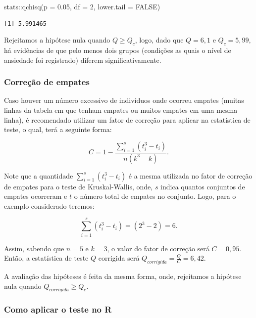 \documentclass[
  letterpaper,
  DIV=11,
  numbers=noendperiod]{scrreprt}
\newenvironment{Shaded}{\begin{snugshade}}{\end{snugshade}}
\newcommand{\AttributeTok}[1]{\textcolor[rgb]{0.40,0.45,0.13}{#1}}
\newcommand{\ConstantTok}[1]{\textcolor[rgb]{0.56,0.35,0.01}{#1}}
\newcommand{\DecValTok}[1]{\textcolor[rgb]{0.68,0.00,0.00}{#1}}
\newcommand{\FloatTok}[1]{\textcolor[rgb]{0.68,0.00,0.00}{#1}}
\newcommand{\FunctionTok}[1]{\textcolor[rgb]{0.28,0.35,0.67}{#1}}
\newcommand{\NormalTok}[1]{\textcolor[rgb]{0.00,0.23,0.31}{#1}}
\newcommand{\SpecialCharTok}[1]{\textcolor[rgb]{0.37,0.37,0.37}{#1}}
\begin{document}
\begin{Shaded}
\begin{Highlighting}[]
\NormalTok{stats}\SpecialCharTok{::}\FunctionTok{qchisq}\NormalTok{(}\AttributeTok{p =} \FloatTok{0.05}\NormalTok{, }\AttributeTok{df =} \DecValTok{2}\NormalTok{, }\AttributeTok{lower.tail =} \ConstantTok{FALSE}\NormalTok{)}
\end{Highlighting}
\end{Shaded}

\begin{verbatim}
[1] 5.991465
\end{verbatim}

Rejeitamos a hipótese nula quando \(Q \geq Q_c\), logo, dado que
\(Q = 6,1\) e \(Q_c = 5,99\), há evidências de que pelo menos dois
grupos (condições as quais o nível de ansiedade foi registrado) diferem
significativamente.

\hypertarget{correuxe7uxe3o-de-empates}{%
\subsubsection{Correção de empates}\label{correuxe7uxe3o-de-empates}}

Caso houver um número excessivo de indivíduos onde ocorreu empates
(muitas linhas da tabela em que tenham empates ou muitos empates em uma
mesma linha), é recomendado utilizar um fator de correção para aplicar
na estatística de teste, o qual, terá a seguinte forma:

\[C=1- \displaystyle\frac{\sum_{i=1}^s\left(t_i^3-t_i\right)}{n\left(k^3-k\right)}.\]

Note que a quantidade
\(\displaystyle \sum_{i=1}^s\left(t_i^3-t_i\right)\) é a mesma utilizada
no fator de correção de empates para o teste de Kruskal-Wallis, onde,
\(s\) indica quantos conjuntos de empates ocorreram e \(t\) o número
total de empates no conjunto. Logo, para o exemplo considerado teremos:

\[\displaystyle \sum_{i=1}^s\left(t_i^3-t_i\right) = \left(2^3-2\right) = 6.\]

Assim, sabendo que \(n = 5\) e \(k = 3\), o valor do fator de correção
será \(C = 0,95\). Então, a estatística de teste \(Q\) corrigida será
\(Q_{corrigida} = \displaystyle \frac{Q}{C} = 6,42\).

A avaliação das hipóteses é feita da mesma forma, onde, rejeitamos a
hipótese nula quando \(Q_{corrigida} \geq Q_c\).

\hypertarget{como-aplicar-o-teste-no-r-5}{%
\subsubsection{Como aplicar o teste no
R}\label{como-aplicar-o-teste-no-r-5}}
\end{document}
